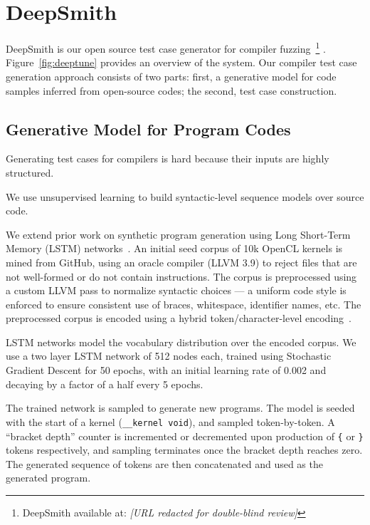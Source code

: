 \section{DeepSmith}

DeepSmith is our open source test case generator for compiler fuzzing~\footnote{DeepSmith available at: \emph{[URL redacted for double-blind review]}} . Figure~\ref{fig:deeptune} provides an overview of the system. Our compiler test case generation approach consists of two parts: first, a generative model for code samples inferred from open-source codes; the second, test case construction.


\subsection{Generative Model for Program Codes}

Generating test cases for compilers is hard because their inputs are highly structured.

We use unsupervised learning to build syntactic-level sequence models over source code.

We extend prior work on synthetic program generation using Long Short-Term Memory (LSTM) networks~\cite{Cummins2017a}. An initial seed corpus of 10k OpenCL kernels is mined from GitHub, using an oracle compiler (LLVM 3.9) to reject files that are not well-formed or do not contain instructions. The corpus is preprocessed using a custom LLVM pass to normalize syntactic choices --- a uniform code style is enforced to ensure consistent use of braces, whitespace, identifier names, etc. The preprocessed corpus is encoded using a hybrid token/character-level encoding~\cite{Cummins2017b}. 

LSTM networks model the vocabulary distribution over the encoded corpus. We use a two layer LSTM network of 512 nodes each, trained using Stochastic Gradient Descent for 50 epochs, with an initial learning rate of 0.002 and decaying by a factor of a half every 5 epochs. %

The trained network is sampled to generate new programs. The model is seeded with the start of a kernel (\texttt{\_\_kernel void}), and sampled token-by-token. A ``bracket depth'' counter is incremented or decremented upon production of \texttt{\{} or \texttt{\}} tokens respectively, and sampling terminates once the bracket depth reaches zero. The generated sequence of tokens are then concatenated and used as the generated program.

